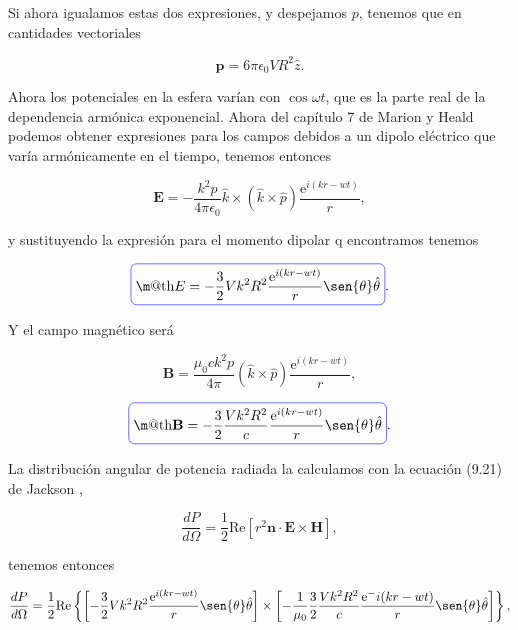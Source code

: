 \documentclass[a4paper,11pt]{article}
\makeatletter
\numberwithin{equation}{section}
\newcommand*{\boxcolor}{blue}
\renewcommand{\boxed}[1]{\textcolor{\boxcolor}{%
\tikz[baseline={([yshift=-1ex]current bounding box.center)}] \node [rectangle, minimum width=1ex,rounded corners,draw] {\normalcolor\m@th$\displaystyle#1$};}}
\newcommand{\euler}{\mathrm{e}}
\makeatother
\begin{document}
Si ahora igualamos estas dos expresiones, y despejamos $p$, tenemos que en 
cantidades vectoriales 

\begin{equation}
 \mathbf{p} = 6\pi \epsilon_0 V R^2 \hat{z}.
\end{equation}

Ahora los potenciales en la esfera varían con $\cos{\omega t}$, que es la parte 
real de la dependencia armónica exponencial. Ahora del capítulo 7 de Marion y 
Heald \cite{marion} podemos obtener expresiones para los campos debidos 
a un dipolo eléctrico que varía armónicamente en el tiempo, tenemos entonces 

\begin{equation}
 \mathbf{E} = - \frac{k^2p}{4\pi\epsilon_0} \hat{k} \times (\hat{k} \times \hat{p}) 
 \frac{\euler^{i(kr - wt)}}{r},
\end{equation}

y sustituyendo la expresión para el momento dipolar q encontramos tenemos 

\begin{equation}
 \boxed{E = - \frac{3}{2} V k^2 R^2  \frac{\euler^{i(kr - wt)}}{r} \sen{\theta}
 \hat{\theta}}.
\end{equation}

Y el campo magnético será 

\begin{equation}
 \mathbf{B} = \frac{\mu_0 c k^2 p}{4\pi} (\hat{k} \times \hat{p}) 
 \frac{\euler^{i(kr - wt)}}{r},
\end{equation}

\begin{equation}
 \boxed{\mathbf{B} = - \frac{3}{2} \frac{V k^2 R^2}{c} \frac{\euler^{i(kr - wt)}}{r}
 \sen{\theta} \hat{\theta}}.
\end{equation}

La distribución angular de potencia radiada la calculamos con la ecuación 
(9.21) de Jackson \cite{jackson},

\begin{equation}
 \frac{dP}{d\Omega} = \frac{1}{2}\text{Re}[r^2\mathbf{n} \cdot \mathbf{E} \times 
 \mathbf{H}], 
\end{equation}

tenemos entonces 

\begin{equation}
 \frac{dP}{d\Omega} = \frac{1}{2} \text{Re}\left\{\left[- \frac{3}{2}Vk^2R^2 
 \frac{\euler^{i(kr - wt)}}{r}\sen{\theta} \hat{\theta}\right] \times 
 \left[- \frac{1}{\mu_0} \frac{3}{2} \frac{V k^2 R^2}{c} \frac{\euler^-{i(kr - wt)}}{r}
 \sen{\theta} \hat{\theta}\right]\right\},
\end{equation}
\end{document}

